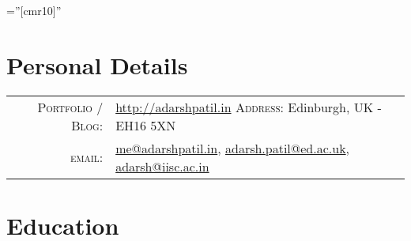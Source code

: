 \documentclass[a4paper,10pt]{article} %
\begin{document}
\pagestyle{empty} %

\font\fb=''[cmr10]'' %


\par{\bigskip\par} %

\section{Personal Details}

\begin{tabular}{rl}
\textsc{Portfolio / Blog:} & \href{http://adarshpatil.in/timewarp}{http://adarshpatil.in} \hspace{2cm} \textsc{Address:} Edinburgh, UK - EH16 5XN\\
\textsc{email:} & \href{mailto:me@adarshpatil.in}{me@adarshpatil.in}, \href{mailto:adarsh.patil@ed.ac.uk}{adarsh.patil@ed.ac.uk}, \href{mailto:adarsh@iisc.ac.in}{adarsh@iisc.ac.in}\\
\end{tabular}


\section{Education}
\end{document}
